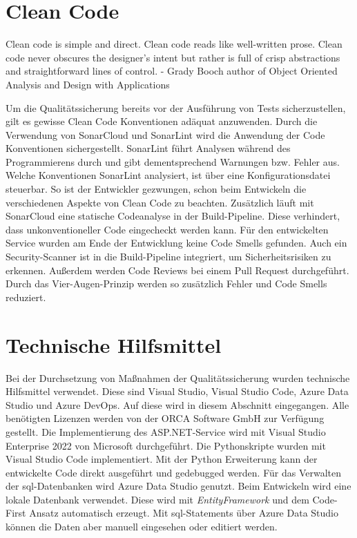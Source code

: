 \section{Clean Code}
\label{c:qs:cleancode}
\begin{definition}
	\label{def:clean-code}
	\glqq Clean code is simple and direct. Clean code reads like well-written prose. Clean code never obscures the designer’s intent but rather is full of crisp abstractions and straightforward lines of control. - Grady Booch author of Object Oriented Analysis and Design with	Applications\grqq{} \citep[p.~8]{martin2009clean}
\end{definition}
Um die Qualitätssicherung bereits vor der Ausführung von Tests sicherzustellen, gilt es gewisse Clean Code Konventionen adäquat anzuwenden.
Durch die Verwendung von SonarCloud und SonarLint wird die Anwendung der Code Konventionen sichergestellt. SonarLint führt Analysen während des Programmierens durch und gibt dementsprechend Warnungen bzw. Fehler aus. Welche Konventionen SonarLint analysiert, ist über eine Konfigurationsdatei steuerbar. So ist der Entwickler gezwungen, schon beim Entwickeln die verschiedenen Aspekte von Clean Code zu beachten. Zusätzlich läuft mit SonarCloud eine statische Codeanalyse in der Build-Pipeline. Diese verhindert, dass unkonventioneller Code eingecheckt werden kann. Für den entwickelten Service wurden am Ende der Entwicklung keine Code Smells gefunden. Auch ein Security-Scanner ist in die Build-Pipeline integriert, um Sicherheitsrisiken zu erkennen. Außerdem werden Code Reviews bei einem Pull Request durchgeführt. Durch das Vier-Augen-Prinzip werden so zusätzlich Fehler und Code Smells reduziert.

\section{Technische Hilfsmittel}
\label{c:qs:technical_aids}
Bei der Durchsetzung von Maßnahmen der Qualitätssicherung wurden technische Hilfsmittel verwendet. Diese sind Visual Studio, Visual Studio Code, Azure Data Studio und Azure DevOps. Auf diese wird in diesem Abschnitt eingegangen. Alle benötigten Lizenzen werden von der \glqq ORCA Software GmbH\grqq{} zur Verfügung gestellt. Die Implementierung des ASP.NET-Service wird mit Visual Studio Enterprise 2022 von Microsoft durchgeführt. Die Pythonskripte wurden mit Visual Studio Code implementiert. Mit der \glqq Python\grqq{} Erweiterung kann der entwickelte Code direkt ausgeführt und gedebugged werden.
Für das Verwalten der \ac{sql}-Datenbanken wird Azure Data Studio genutzt. Beim Entwickeln wird eine lokale Datenbank verwendet. Diese wird mit \textit{EntityFramework} und dem Code-First Ansatz automatisch erzeugt. Mit \ac{sql}-Statements über Azure Data Studio können die Daten aber manuell eingesehen oder editiert werden.

